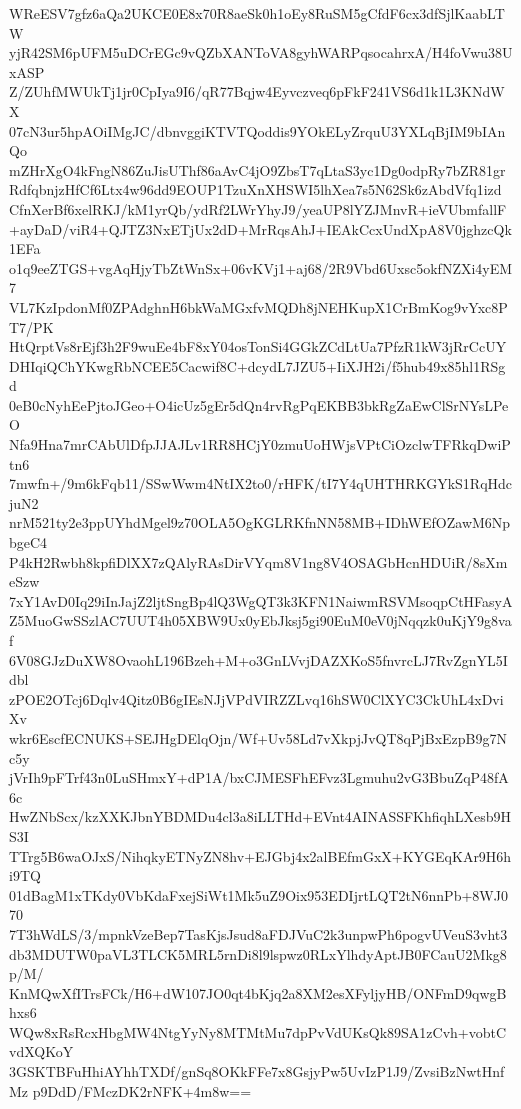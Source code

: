WReESV7gfz6aQa2UKCE0E8x70R8aeSk0h1oEy8RuSM5gCfdF6cx3dfSjlKaabLTW
yjR42SM6pUFM5uDCrEGc9vQZbXANToVA8gyhWARPqsocahrxA/H4foVwu38UxASP
Z/ZUhfMWUkTj1jr0CpIya9I6/qR77Bqjw4Eyvczveq6pFkF241VS6d1k1L3KNdWX
07cN3ur5hpAOiIMgJC/dbnvggiKTVTQoddis9YOkELyZrquU3YXLqBjIM9bIAnQo
mZHrXgO4kFngN86ZuJisUThf86aAvC4jO9ZbsT7qLtaS3yc1Dg0odpRy7bZR81gr
RdfqbnjzHfCf6Ltx4w96dd9EOUP1TzuXnXHSWI5lhXea7s5N62Sk6zAbdVfq1izd
CfnXerBf6xelRKJ/kM1yrQb/ydRf2LWrYhyJ9/yeaUP8lYZJMnvR+ieVUbmfallF
+ayDaD/viR4+QJTZ3NxETjUx2dD+MrRqsAhJ+IEAkCcxUndXpA8V0jghzcQk1EFa
o1q9eeZTGS+vgAqHjyTbZtWnSx+06vKVj1+aj68/2R9Vbd6Uxsc5okfNZXi4yEM7
VL7KzIpdonMf0ZPAdghnH6bkWaMGxfvMQDh8jNEHKupX1CrBmKog9vYxc8PT7/PK
HtQrptVs8rEjf3h2F9wuEe4bF8xY04osTonSi4GGkZCdLtUa7PfzR1kW3jRrCcUY
DHIqiQChYKwgRbNCEE5Cacwif8C+dcydL7JZU5+IiXJH2i/f5hub49x85hl1RSgd
0eB0cNyhEePjtoJGeo+O4icUz5gEr5dQn4rvRgPqEKBB3bkRgZaEwClSrNYsLPeO
Nfa9Hna7mrCAbUlDfpJJAJLv1RR8HCjY0zmuUoHWjsVPtCiOzclwTFRkqDwiPtn6
7mwfn+/9m6kFqb11/SSwWwm4NtIX2to0/rHFK/tI7Y4qUHTHRKGYkS1RqHdcjuN2
nrM521ty2e3ppUYhdMgel9z70OLA5OgKGLRKfnNN58MB+IDhWEfOZawM6NpbgeC4
P4kH2Rwbh8kpfiDlXX7zQAlyRAsDirVYqm8V1ng8V4OSAGbHcnHDUiR/8sXmeSzw
7xY1AvD0Iq29iInJajZ2ljtSngBp4lQ3WgQT3k3KFN1NaiwmRSVMsoqpCtHFasyA
Z5MuoGwSSzlAC7UUT4h05XBW9Ux0yEbJksj5gi90EuM0eV0jNqqzk0uKjY9g8vaf
6V08GJzDuXW8OvaohL196Bzeh+M+o3GnLVvjDAZXKoS5fnvrcLJ7RvZgnYL5Idbl
zPOE2OTcj6Dqlv4Qitz0B6gIEsNJjVPdVIRZZLvq16hSW0ClXYC3CkUhL4xDviXv
wkr6EscfECNUKS+SEJHgDElqOjn/Wf+Uv58Ld7vXkpjJvQT8qPjBxEzpB9g7Nc5y
jVrIh9pFTrf43n0LuSHmxY+dP1A/bxCJMESFhEFvz3Lgmuhu2vG3BbuZqP48fA6c
HwZNbScx/kzXXKJbnYBDMDu4cl3a8iLLTHd+EVnt4AINASSFKhfiqhLXesb9HS3I
TTrg5B6waOJxS/NihqkyETNyZN8hv+EJGbj4x2alBEfmGxX+KYGEqKAr9H6hi9TQ
01dBagM1xTKdy0VbKdaFxejSiWt1Mk5uZ9Oix953EDIjrtLQT2tN6nnPb+8WJ070
7T3hWdLS/3/mpnkVzeBep7TasKjsJsud8aFDJVuC2k3unpwPh6pogvUVeuS3vht3
db3MDUTW0paVL3TLCK5MRL5rnDi8l9lspwz0RLxYlhdyAptJB0FCauU2Mkg8p/M/
KnMQwXfITrsFCk/H6+dW107JO0qt4bKjq2a8XM2esXFyljyHB/ONFmD9qwgBhxs6
WQw8xRsRcxHbgMW4NtgYyNy8MTMtMu7dpPvVdUKsQk89SA1zCvh+vobtCvdXQKoY
3GSKTBFuHhiAYhhTXDf/gnSq8OKkFFe7x8GsjyPw5UvIzP1J9/ZvsiBzNwtHnfMz
p9DdD/FMczDK2rNFK+4m8w==
